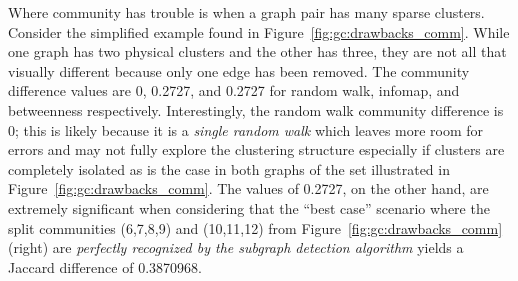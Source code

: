Where community has trouble is when a graph pair has many sparse clusters. 
Consider the simplified example found in Figure~\ref{fig:gc:drawbacks_comm}. 
While one graph has two physical clusters and the other has three, they are not 
all that visually different because only one edge has been removed. The 
community difference values are 0, 0.2727, and 0.2727 for random walk, infomap, 
and betweenness respectively.
Interestingly, the random walk community difference is 0; this is 
likely because it is a \textit{single random walk} which leaves more room for 
errors and may not fully explore the clustering structure especially if 
clusters are completely isolated as is the case in both graphs of the set 
illustrated in Figure~\ref{fig:gc:drawbacks_comm}. 
The values of 0.2727, on the other hand, are extremely significant when 
considering that the ``best case'' scenario where the split communities 
(6,7,8,9) and (10,11,12) from Figure~\ref{fig:gc:drawbacks_comm} (right) are 
\textit{perfectly recognized by the subgraph detection algorithm} yields a 
Jaccard difference of 0.3870968. 










